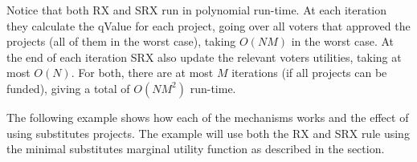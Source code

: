 \documentclass[runningheads]{llncs}
\begin{document}
Notice that both RX and SRX run in polynomial run-time. At each iteration they calculate the qValue for each project, going over all voters that approved the projects (all of them in the worst case), taking $O(NM)$ in the worst case. At the end of each iteration SRX also update the relevant voters utilities, taking at most $O(N)$. For both, there are at most $M$ iterations (if all projects can be funded), giving a total of $O(NM^2)$ run-time.


The following example shows how each of the mechanisms works and the effect of using substitutes projects. The example will use both the  RX and SRX rule using the  minimal substitutes marginal utility function as described in the  section.
\end{document}
